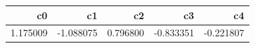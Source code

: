 \begin{tabular}{rrrrr}
\toprule
c0 & c1 & c2 & c3 & c4 \\
\midrule
1.175009 & -1.088075 & 0.796800 & -0.833351 & -0.221807 \\
\bottomrule
\end{tabular}
